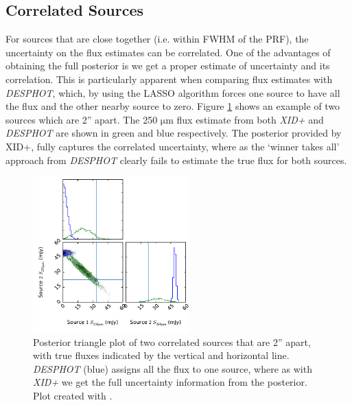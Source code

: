 \documentclass[useAMS,usenatbib]{mnras}
\begin{document}
\subsection{Correlated Sources}
For sources that are close together (i.e. within FWHM of the PRF), the uncertainty on the flux estimates can be correlated. One of the advantages of obtaining the full posterior is we get a proper estimate of uncertainty and its correlation. This is particularly apparent when comparing flux estimates with \emph{DESPHOT}, which, by using the LASSO algorithm forces one source to have all the flux and the other nearby source to zero. Figure \ref{fig:corr} shows an example of two sources which are 2'' apart. The 250 $\mathrm{\mu m}$ flux estimate from both \emph{XID+} and \emph{DESPHOT} are shown in green and blue respectively. The posterior provided by XID+, fully captures the correlated uncertainty, where as the `winner takes all' approach from \emph{DESPHOT} clearly fails to estimate the true flux for both sources.
 
\begin{figure} 
\includegraphics[width=6cm]{example_tri_DESHPOT_XIDp.pdf}
\caption{Posterior triangle plot of two correlated sources that are 2'' apart, with true fluxes indicated by the vertical and horizontal line. \emph{DESPHOT} (blue) assigns all the flux to one source, where as with \emph{XID+} we get the full uncertainty information from the posterior. Plot created with \protect\cite{triangle}.}\label{fig:corr}
\end{figure}
\end{document}

